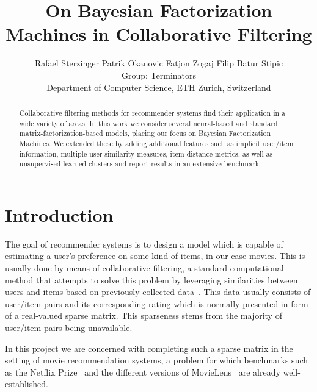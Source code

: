\documentclass[10pt,conference,compsocconf]{IEEEtran}
\newcommand{\spacing}{\hspace{1cm}}
\begin{document}
    \setlength{\abovedisplayskip}{2pt}
    \setlength{\belowdisplayskip}{2pt}
    \setlength{\abovedisplayshortskip}{2pt}
    \setlength{\belowdisplayshortskip}{2pt}
    \title{On Bayesian Factorization Machines in Collaborative Filtering}

    \author{
        Rafael Sterzinger \spacing Patrik Okanovic \spacing Fatjon Zogaj \spacing Filip Batur Stipic\\
        Group: Terminators\\
        Department of Computer Science, ETH Zurich, Switzerland
    }

    \maketitle

    \begin{abstract}
        Collaborative filtering methods for recommender systems find their application in a wide variety of areas.
        In this work we consider several neural-based and standard matrix-factorization-based models, placing our focus on Bayesian Factorization Machines.
        We extended these by adding additional features such as implicit user/item information, multiple user similarity measures, item distance metrics, as well as unsupervised-learned clusters and report results in an extensive benchmark.
    \end{abstract}


    \section{Introduction}

    The goal of recommender systems is to design a model which is capable of estimating a user's preference on some kind of items, in our case movies.
    This is usually done by means of collaborative filtering, a standard computational method that attempts to solve this problem by leveraging similarities between users and items based on previously collected data~\cite{CF_survey}.
    This data usually consists of user/item pairs and its corresponding rating which is normally presented in form of a real-valued sparse matrix.
    This sparseness stems from the majority of user/item pairs being unavailable.

    In this project we are concerned with completing such a sparse matrix in the setting of movie recommendation systems, a problem for which benchmarks such as the Netflix Prize~\cite{Netflix} and the different versions of MovieLens~\cite{Movielens} are already well-established.
\end{document}

